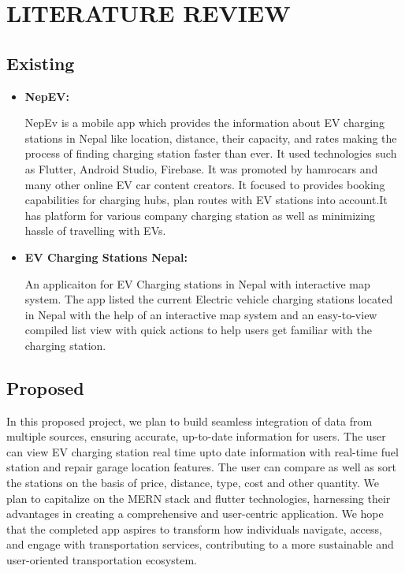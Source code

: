 \newpage

\section{LITERATURE REVIEW}
\subsection{Existing}
\begin{itemize}
    \item \textbf{NepEV:}
    
    NepEv is a mobile app which provides the information about EV charging stations in Nepal like location, distance, their capacity, and rates making the process of finding charging station faster than ever. \cite{Nep_EV}It used technologies such as Flutter, Android Studio, Firebase. It was promoted by hamrocars and many other online EV car content creators. It focused to provides booking capabilities for charging hubs, plan routes with EV stations into account.It has platform for various company charging station as well as minimizing hassle of travelling with EVs.
    
    \item \textbf{EV Charging Stations Nepal:}
    
    \cite{EV_App}An applicaiton for EV Charging stations in Nepal with interactive map system. The app listed the current Electric vehicle charging stations located in Nepal with the help of an interactive map system and an easy-to-view compiled list view with quick actions to help users get familiar with the charging station.
\end{itemize}

\newpage
\subsection{Proposed}
In this proposed project, we plan to build seamless integration of data from multiple sources, ensuring accurate, up-to-date information for users. The user can view EV charging station real time upto date information with real-time fuel station and repair garage location features. The user can compare as well as sort the stations on the basis of price, distance, type, cost and other quantity. We plan to capitalize on the MERN stack and flutter technologies, harnessing their advantages in creating a comprehensive and user-centric application. We hope that the completed app aspires to transform how individuals navigate, access, and engage with transportation services, contributing to a more sustainable and user-oriented transportation ecosystem.

